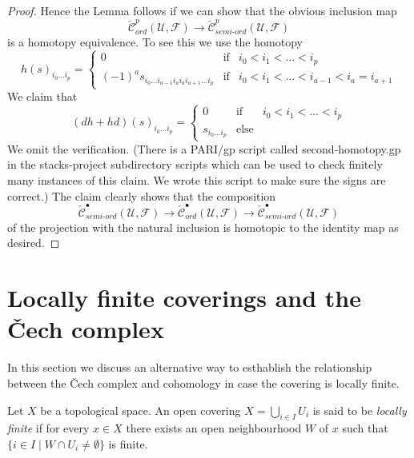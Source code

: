 \begin{proof}
\medskip\noindent
Hence the Lemma follows if we can show that the obvious inclusion map
$$
\check{\mathcal{C}}_{ord}^p(\mathcal{U}, \mathcal{F})
\longrightarrow
\check{\mathcal{C}}_{semi\text{-}ord}^p(\mathcal{U}, \mathcal{F})
$$
is a homotopy equivalence. To see this we use the homotopy
\begin{equation}
\label{equation-second-homotopy}
h(s)_{i_0 \ldots i_p} =
\left\{
\begin{matrix}
0 & \text{if} & i_0 < i_1 < \ldots < i_p \\
(-1)^a s_{i_0 \ldots i_{a - 1} i_a i_a i_{a + 1} \ldots i_p}
& \text{if} & i_0 < i_1 < \ldots < i_{a - 1} < i_a = i_{a + 1}
\end{matrix}
\right.
\end{equation}
We claim that
$$
(dh + hd)(s)_{i_0 \ldots i_p} =
\left\{
\begin{matrix}
0 & \text{if} & i_0 < i_1 < \ldots < i_p \\
s_{i_0 \ldots i_p}
& \text{else} &
\end{matrix}
\right.
$$
We omit the verification. (There is a PARI/gp script called second-homotopy.gp
in the stacks-project subdirectory scripts which can be used to check
finitely many instances of this claim.
We wrote this script to make sure the signs are correct.)
The claim clearly shows that the composition
$$
\check{\mathcal{C}}_{semi\text{-}ord}^\bullet(\mathcal{U}, \mathcal{F})
\longrightarrow
\check{\mathcal{C}}_{ord}^\bullet(\mathcal{U}, \mathcal{F})
\longrightarrow
\check{\mathcal{C}}_{semi\text{-}ord}^\bullet(\mathcal{U}, \mathcal{F})
$$
of the projection with the natural inclusion
is homotopic to the identity map as desired.
\end{proof}





\section{Locally finite coverings and the {\v C}ech complex}
\label{section-locally-finite-cech}

\noindent
In this section we discuss an alternative way to esthablish the relationship
between the {\v C}ech complex and cohomology in case the covering is locally
finite.

\begin{definition}
\label{definition-covering-locally-finite}
Let $X$ be a topological space.
An open covering $X = \bigcup_{i \in I} U_i$ is said to be
{\it locally finite} if for every $x \in X$ there exists an open neighbourhood
$W$ of $x$ such that $\{i \in I \mid W \cap U_i \not = \emptyset\}$ is finite.
\end{definition}

